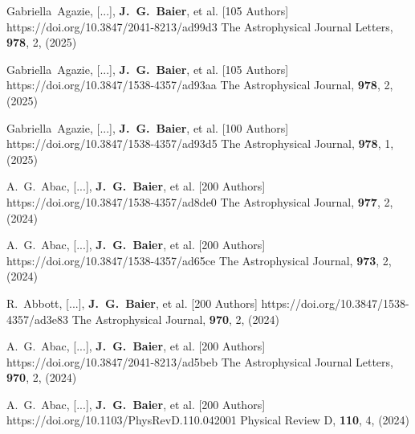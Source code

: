          {Gabriella~{Agazie}, [...], \textbf{J.~G.~{Baier}}, et al. [105 Authors]}
         {https://doi.org/10.3847/2041-8213/ad99d3}
         {{The Astrophysical Journal Letters}, \textbf{978}, 2, (2025)}

         {Gabriella~{Agazie}, [...], \textbf{J.~G.~{Baier}}, et al. [105 Authors]}
         {https://doi.org/10.3847/1538-4357/ad93aa}
         {{The Astrophysical Journal}, \textbf{978}, 2, (2025)}

         {Gabriella~{Agazie}, [...], \textbf{J.~G.~{Baier}}, et al. [100 Authors]}
         {https://doi.org/10.3847/1538-4357/ad93d5}
         {{The Astrophysical Journal}, \textbf{978}, 1, (2025)}

         {A.~G.~{Abac}, [...], \textbf{J.~G.~{Baier}}, et al. [200 Authors]}
         {https://doi.org/10.3847/1538-4357/ad8de0}
         {{The Astrophysical Journal}, \textbf{977}, 2, (2024)}

         {A.~G.~{Abac}, [...], \textbf{J.~G.~{Baier}}, et al. [200 Authors]}
         {https://doi.org/10.3847/1538-4357/ad65ce}
         {{The Astrophysical Journal}, \textbf{973}, 2, (2024)}

         {R.~{Abbott}, [...], \textbf{J.~G.~{Baier}}, et al. [200 Authors]}
         {https://doi.org/10.3847/1538-4357/ad3e83}
         {{The Astrophysical Journal}, \textbf{970}, 2, (2024)}

         {A.~G.~{Abac}, [...], \textbf{J.~G.~{Baier}}, et al. [200 Authors]}
         {https://doi.org/10.3847/2041-8213/ad5beb}
         {{The Astrophysical Journal Letters}, \textbf{970}, 2, (2024)}

         {A.~G.~{Abac}, [...], \textbf{J.~G.~{Baier}}, et al. [200 Authors]}
         {https://doi.org/10.1103/PhysRevD.110.042001}
         {{Physical Review D}, \textbf{110}, 4, (2024)}

